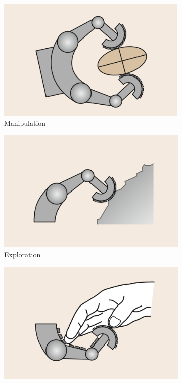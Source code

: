 \documentclass[USenglish]{ifimaster}  %
\begin{document}
	\begin{figure}
	\centering
	\begin{subfigure}[b]{0.32\textwidth}
		\centering
		\includegraphics[width=\linewidth]{Figures/tactiles1}
		\caption{Manipulation}
		\label{fig:tact1}
	\end{subfigure}\hfill
	\begin{subfigure}[b]{0.32\textwidth}
		\centering
		\includegraphics[width=\linewidth]{Figures/tactiles2}
		\caption{Exploration}
		\label{fig:tact2}
	\end{subfigure}\hfill
	\begin{subfigure}[b]{0.32\textwidth}
		\centering
		\includegraphics[width=\linewidth]{Figures/tactiles3}

\end{subfigure}
\end{figure}
\end{document}
